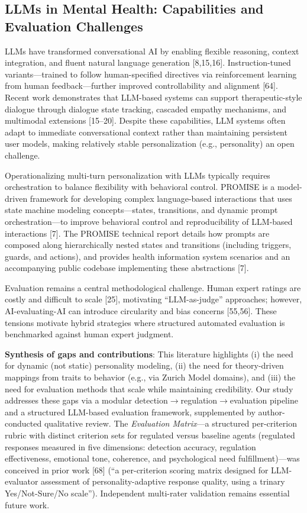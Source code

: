 \subsection{LLMs in Mental Health: Capabilities and Evaluation Challenges}\label{llms-in-mental-health-capabilities-and-evaluation-challenges}

LLMs have transformed conversational AI by enabling flexible reasoning, context integration, and fluent natural language generation {[}8,15,16{]}. Instruction-tuned variants---trained to follow human-specified directives via reinforcement learning from human feedback---further improved controllability and alignment {[}64{]}. Recent work demonstrates that LLM-based systems can support therapeutic-style dialogue through dialogue state tracking, cascaded empathy mechanisms, and multimodal extensions {[}15--20{]}. Despite these capabilities, LLM systems often adapt to immediate conversational context rather than maintaining persistent user models, making relatively stable personalization (e.g., personality) an open challenge.

Operationalizing multi-turn personalization with LLMs typically requires orchestration to balance flexibility with behavioral control. PROMISE is a model-driven framework for developing complex language-based interactions that uses state machine modeling concepts---states, transitions, and dynamic prompt orchestration---to improve behavioral control and reproducibility of LLM-based interactions {[}7{]}. The PROMISE technical report details how prompts are composed along hierarchically nested states and transitions (including triggers, guards, and actions), and provides health information system scenarios and an accompanying public codebase implementing these abstractions {[}7{]}.

Evaluation remains a central methodological challenge. Human expert ratings are costly and difficult to scale {[}25{]}, motivating ``LLM-as-judge'' approaches; however, AI-evaluating-AI can introduce circularity and bias concerns {[}55,56{]}. These tensions motivate hybrid strategies where structured automated evaluation is benchmarked against human expert judgment.

\textbf{Synthesis of gaps and contributions}: This literature highlights (i) the need for dynamic (not static) personality modeling, (ii) the need for theory-driven mappings from traits to behavior (e.g., via Zurich Model domains), and (iii) the need for evaluation methods that scale while maintaining credibility. Our study addresses these gaps via a modular detection$\rightarrow$regulation$\rightarrow$evaluation pipeline and a structured LLM-based evaluation framework, supplemented by author-conducted qualitative review. The \emph{Evaluation Matrix}---a structured per-criterion rubric with distinct criterion sets for regulated versus baseline agents (regulated responses measured in five dimensions: detection accuracy, regulation effectiveness, emotional tone, coherence, and psychological need fulfillment)---was conceived in prior work {[}68{]} (``a per-criterion scoring matrix designed for LLM-evaluator assessment of personality-adaptive response quality, using a trinary Yes/Not-Sure/No scale''). Independent multi-rater validation remains essential future work.

